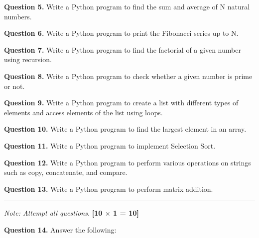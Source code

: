 \documentclass[11pt,a4paper]{article}
\begin{document}
\medskip


\noindent   \textbf{Question 5.} Write a Python program to find the sum and average of N natural numbers.

\medskip


\noindent   \textbf{Question 6.} Write a Python program to print the Fibonacci series up to N.

\medskip


\noindent   \textbf{Question 7.} Write a Python program to find the factorial of a given number using recursion.

\medskip


\noindent   \textbf{Question 8.} Write a Python program to check whether a given number is prime or not.

\medskip


\noindent   \textbf{Question 9.} Write a Python program to create a list with different types of elements and access elements of the list using loops.

\medskip


\noindent   \textbf{Question 10.} Write a Python program to find the largest element in an array.

\medskip


\noindent   \textbf{Question 11.} Write a Python program to implement Selection Sort.

\medskip


\noindent   \textbf{Question 12.} Write a Python program to perform various operations on strings such as copy, concatenate, and compare.

\medskip


\noindent   \textbf{Question 13.} Write a Python program to perform matrix addition.

\bigskip


\rule{\linewidth}{0.4pt}\smallskip




\noindent   \textit{Note: Attempt all questions.} \hfill   \textbf{[10 $ \times$ 1 = 10]}

\medskip


\noindent   \textbf{Question 14.} Answer the following:
\end{document}
